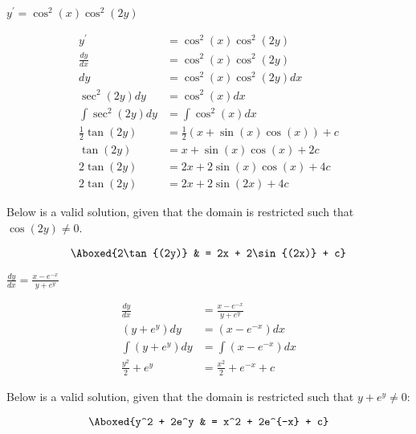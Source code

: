 \documentclass{lapchomework}
\begin{document}
\begin{problems}

\problem [3] $y^{\prime}=\cos^2{(x)}\cos^2{(2y)}$

\begin{solution}

\step \begin{align*}
y^{\prime} & = \cos^2{(x)} \cos^2{(2y)} \\
\frac{dy}{dx} & = \cos^2{(x)} \cos^2{(2y)} \\
dy & = \cos^2{(x)} \cos^2{(2y)} dx \\
\sec^{2}{(2y)} dy & = \cos^2{(x)} dx \\
\int \sec^{2}{(2y)} dy & = \int \cos^2{(x)} dx \\
\frac{1}{2} \tan{(2y)} & = \frac{1}{2} \left(x + \sin{(x)}\cos{(x)}\right) 
+ c \\
\tan{(2y)} & = x + \sin{(x)}\cos{(x)} + 2c \\
2\tan{(2y)} & = 2x + 2\sin{(x)}\cos{(x)} + 4c \\
2\tan{(2y)} & = 2x + 2\sin{(2x)} + 4c 
\end{align*}

\step Below is a valid solution, given that the domain is restricted such that 
$\cos{(2y)} \neq 0$.

\step \begin{align*}
\Aboxed{2\tan{(2y)} & = 2x + 2\sin{(2x)} + c}
\end{align*}

\end{solution}

\pagebreak

\problem [5] $\frac{dy}{dx}=\frac{x-e^{-x}}{y+e^y}$

\begin{solution}

\step \begin{align*}
\frac{dy}{dx} & = \frac{x-e^{-x}}{y+e^y} \\
\left(y+e^y\right)dy & = \left(x-e^{-x}\right) dx \\
\int \left(y+e^y\right)dy & = \int \left(x-e^{-x}\right) dx \\
\frac{y^2}{2} + e^y & = \frac{x^2}{2} + e^{-x} + c
\end{align*}

\step Below is a valid solution, given that the domain is restricted such that
$y+e^y \neq 0$:

\step \begin{align*}
\Aboxed{y^2 + 2e^y & = x^2 + 2e^{-x} + c}
\end{align*}

\end{solution}

\end{problems}
\end{document}

